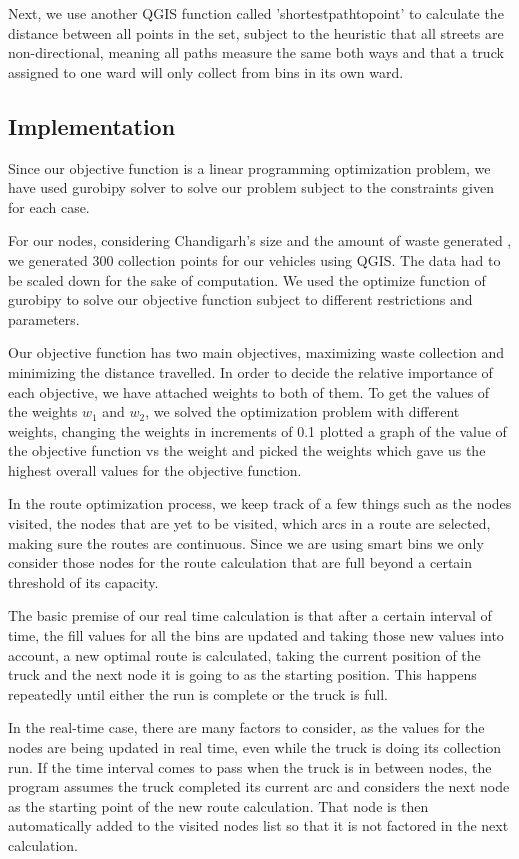 \documentclass[12pt]{article}
\begin{document}
Next, we use another QGIS function called 'shortestpathtopoint' to calculate the distance between all points in the set, subject to the heuristic that all streets are non-directional, meaning all paths measure the same both ways and that a truck assigned to one ward will only collect from bins in its own ward.

\subsection{Implementation}

Since our objective function is a linear programming optimization problem, we have used gurobipy solver to solve our problem subject to the constraints given for each case.

For our nodes, considering Chandigarh's size and the amount of waste generated \cite{ravindra2015system}, we generated 300 collection points for our vehicles using QGIS. The data had to be scaled down for the sake of computation. We used the optimize function of gurobipy to solve our objective function subject to different restrictions and parameters.

Our objective function has two main objectives, maximizing waste collection and minimizing the distance travelled. In order to decide the relative importance of each objective, we have attached weights to both of them. To get the values of the weights $w_1$ and $w_2$, we solved the optimization problem with different weights, changing the weights in increments of 0.1 plotted a graph of the value of the objective function vs the weight and picked the weights which gave us the highest overall values for the objective function.       

In the route optimization process, we keep track of a few things such as the nodes visited, the nodes that are yet to be visited, which arcs in a route are selected, making sure the routes are continuous. Since we are using smart bins we only consider those nodes for the route calculation that are full beyond a certain threshold of its capacity.

The basic premise of our real time calculation is that after a certain interval of time, the fill values for all the bins are updated and taking those new values into account, a new optimal route is calculated, taking the current position of the truck and the next node it is going to as the starting position. This happens repeatedly until either the run is complete or the truck is full.

In the real-time case, there are many factors to consider, as the values for the nodes are being updated in real time, even while the truck is doing its collection run. If the time interval comes to pass when the truck is in between nodes, the program assumes the truck completed its current arc and considers the next node as the starting point of the new route calculation. That node is then automatically added to the visited nodes list so that it is not factored in the next calculation.
\end{document}
